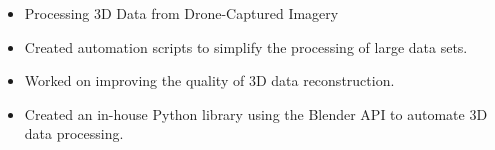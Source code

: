 \dottedline
{}
\begin{itemize}
    \item Processing 3D Data from Drone-Captured Imagery
    \item Created automation scripts to simplify the processing of large data sets.
    \item Worked on improving the quality of 3D data reconstruction.
    \item Created an in-house Python library using the Blender API to automate 3D data processing.
\end{itemize}
